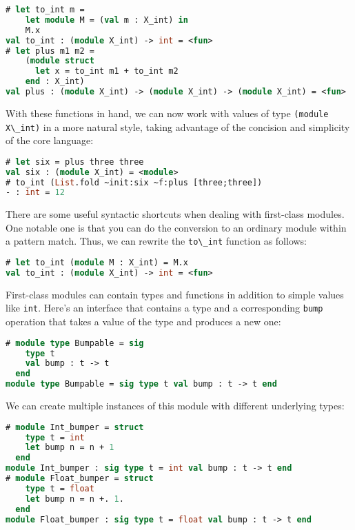\begin{lstlisting}[language=Caml]
# let to_int m =
    let module M = (val m : X_int) in
    M.x
val to_int : (module X_int) -> int = <fun>
# let plus m1 m2 =
    (module struct
      let x = to_int m1 + to_int m2
    end : X_int)
val plus : (module X_int) -> (module X_int) -> (module X_int) = <fun>
\end{lstlisting}

With these functions in hand, we can now work with values of type
\passthrough{\lstinline!(module X\_int)!} in a more natural style,
taking advantage of the concision and simplicity of the core {language}:

\begin{lstlisting}[language=Caml]
# let six = plus three three
val six : (module X_int) = <module>
# to_int (List.fold ~init:six ~f:plus [three;three])
- : int = 12
\end{lstlisting}

There are some useful syntactic shortcuts when dealing with first-class
modules. One notable one is that you can do the conversion to an
ordinary module within a pattern match. Thus, we can rewrite the
\passthrough{\lstinline!to\_int!} function as follows:

\begin{lstlisting}[language=Caml]
# let to_int (module M : X_int) = M.x
val to_int : (module X_int) -> int = <fun>
\end{lstlisting}

First-class modules can contain types and functions in addition to
simple values like \passthrough{\lstinline!int!}. Here's an interface
that contains a type and a corresponding \passthrough{\lstinline!bump!}
operation that takes a value of the type and produces a new one:

\begin{lstlisting}[language=Caml]
# module type Bumpable = sig
    type t
    val bump : t -> t
  end
module type Bumpable = sig type t val bump : t -> t end
\end{lstlisting}

We can create multiple instances of this module with different
underlying types:

\begin{lstlisting}[language=Caml]
# module Int_bumper = struct
    type t = int
    let bump n = n + 1
  end
module Int_bumper : sig type t = int val bump : t -> t end
# module Float_bumper = struct
    type t = float
    let bump n = n +. 1.
  end
module Float_bumper : sig type t = float val bump : t -> t end
\end{lstlisting}


